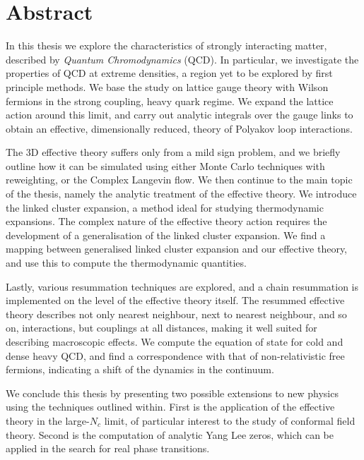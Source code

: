 \begingroup%
\let\clearpage\relax%
\let\cleardoublepage\relax%
\fontsize{12pt}{18pt}\selectfont

\chapter*{Abstract}

In this thesis we explore the characteristics of strongly interacting matter,
described by \emph{Quantum Chromodynamics} (QCD). In particular, we investigate
the properties of QCD at extreme densities, a region yet to be explored by first
principle methods. We base the study on lattice gauge theory with Wilson
fermions in the strong coupling, heavy quark regime. We expand the lattice
action around this limit, and carry out analytic integrals over the gauge links
to obtain an effective, dimensionally reduced, theory of Polyakov loop
interactions.

The 3D effective theory suffers only from a mild sign problem, and we briefly
outline how it can be simulated using either Monte Carlo techniques with
reweighting, or the Complex Langevin flow. We then continue to the main topic of
the thesis, namely the analytic treatment of the effective theory. We introduce
the linked cluster expansion, a method ideal for studying thermodynamic
expansions. The complex nature of the effective theory action requires the
development of a generalisation of the linked cluster expansion. We find a
mapping between generalised linked cluster expansion and our effective theory,
and use this to compute the thermodynamic quantities.

Lastly, various resummation techniques are explored, and a chain resummation is
implemented on the level of the effective theory itself. The resummed effective
theory describes not only nearest neighbour, next to nearest
neighbour, and so on, interactions, but couplings at all distances, making it
well suited for describing macroscopic effects. We compute the equation of state
for cold and dense heavy QCD, and find a correspondence with that of
non-relativistic free fermions, indicating a shift of the dynamics in the
continuum.

We conclude this thesis by presenting two possible extensions to new physics
using the techniques outlined within. First is the application of the effective
theory in the large-$N_c$ limit, of particular interest to the study of
conformal field theory. Second is the computation of analytic Yang Lee zeros,
which can be applied in the search for real phase transitions.
\par \endgroup%
